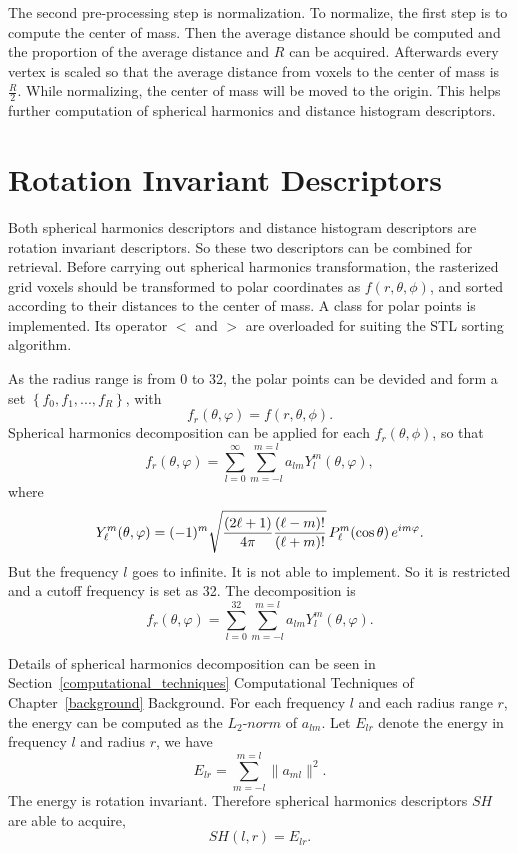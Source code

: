 The second pre-processing step is normalization. To normalize, the first step is to compute the center of mass. Then the average distance should be computed and the proportion of the average distance and $R$ can be acquired. Afterwards every vertex is scaled so that the average distance from voxels to the center of mass is $ \frac{R}{2}$. While normalizing, the center of mass will be moved to the origin. This helps further computation of spherical harmonics and distance histogram descriptors.

\section{Rotation Invariant Descriptors}

Both spherical harmonics descriptors and distance histogram descriptors are rotation invariant descriptors. So these two descriptors can be combined for retrieval. Before carrying out spherical harmonics transformation, the rasterized grid voxels should be transformed to polar coordinates as $f(r,\theta,\phi)$, and sorted according to their distances to the center of mass. A class for polar points is implemented. Its operator $<$ and $>$ are overloaded for suiting the STL sorting algorithm. 

As the radius range is from 0 to 32, the polar points can be devided and form a set ${\left\{ f_0,f_1,...,f_R \right\}}$, with 
\begin{equation}
f_r(\theta,\varphi)=f(r,\theta,\phi).
\end{equation}
Spherical harmonics decomposition can be applied for each $f_r(\theta,\phi)$, so that
\begin{equation}
f_r(\theta,\varphi)=\sum_{l=0}^{\infty}\sum_{m=-l}^{m=l}a_{lm}Y_{l}^{m}(\theta,\varphi),
\end{equation}
where
\begin{equation}
Y_\ell^m( \theta , \varphi ) = (-1)^m \sqrt{{(2\ell+1)\over 4\pi}{(\ell-m)!\over (\ell+m)!}} \, P_\ell^m ( \cos{\theta} ) \, e^{i m \varphi }.
\end{equation}
But the frequency $l$ goes to infinite. It is not able to implement. So it is restricted and a cutoff frequency is set as 32. The decomposition is 
\begin{equation}
f_r(\theta,\varphi)=\sum_{l=0}^{32}\sum_{m=-l}^{m=l}a_{lm}Y_{l}^{m}(\theta,\varphi).
\end{equation}

Details of spherical harmonics decomposition can be seen in Section~\ref{computational_techniques} Computational Techniques of Chapter~\ref{background} Background. For each frequency $l$ and each radius range $r$, the energy can be computed as the $L_{2}$-$norm$ of $a_{lm}$. Let $E_{lr}$ denote the energy in frequency $l$ and radius $r$, we have
\begin{equation}
E_{lr}=\sum_{m=-l}^{m=l}\|a_{ml}\|^{2}.
\end{equation}
The energy is rotation invariant. Therefore spherical harmonics descriptors $SH$ are able to acquire,
\begin{equation}
SH(l,r) = E_{lr}.
\end{equation}

